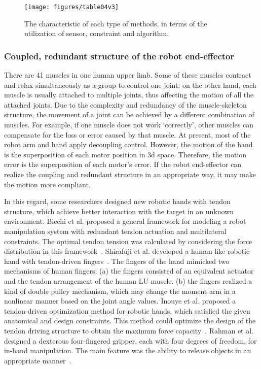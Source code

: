 \documentclass[journal,twoside,web]{ieeecolor}
\begin{document}

\begin{figure*}[h]
    \centering
    \texttt{[image: figures/table04v3]}
    \caption{The characteristic of each type of methods, in terms of the utilization of sensor, constraint and algorithm.}
    \label{fig:table02}
\end{figure*}

\subsubsection{Coupled, redundant structure of the robot end-effector}

There are 41 muscles in one human upper limb. 
Some of these muscles contract and relax simultaneously as a group to control one joint; on the other hand, each muscle is usually attached to multiple joints, thus affecting the motion of all the attached joints.
Due to the complexity and redundancy of the muscle-skeleton structure, the movement of a joint can be achieved by a different combination of muscles.
For example, if one muscle does not work `correctly', other muscles can compensate for the loss or error caused by that muscle. 
At present, most of the robot arm and hand apply decoupling control. However, the motion of the hand is the superposition of each motor position in 3d space. Therefore, the motion error is the superposition of each motor's error. 
If the robot end-effector can realize the coupling and redundant structure in an appropriate way, it may make the motion more compliant. 

In this regard, some researchers designed new robotic hands with tendon structure, which achieve better interaction with the target in an unknown environment. 
Bicchi et al. proposed a general framework for modeling a robot manipulation system with redundant tendon actuation and multilateral constraints. The optimal tendon tension was calculated by considering the force distribution in this framework~\cite{Bicchi2000d}. 
Shirafuji et al. developed a human-like robotic hand with tendon-driven fingers~\cite{Shirafuji2014}. 
The fingers of the hand mimicked two mechanisms of human fingers: 
(a) the fingers consisted of an equivalent actuator and the tendon arrangement of the human LU muscle.
(b) the fingers realized a kind of double pulley mechanism, which may change the moment arm in a nonlinear manner based on the joint angle values.
Inouye et al. proposed a tendon-driven optimization method for robotic hands, which satisfied the given anatomical and design constraints. This method could optimize the design of the tendon driving structure to obtain the maximum force capacity~\cite{Joshua2014}. 
Rahman et al. designed a dexterous four-fingered gripper, each with four degrees of freedom, for in-hand manipulation. The main feature was the ability to release objects in an appropriate manner~\cite{Rahman2016}.
\end{document}
